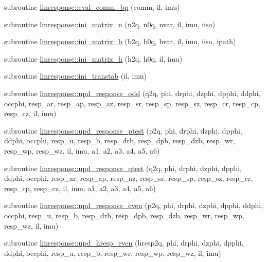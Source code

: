 \begin{DoxyCompactItemize}
\item 
subroutine \hyperlink{namespacelinresponse_adbdb635326275de10b74819756129ab1}{linresponse\+::eval\+\_\+comm\+\_\+bp} (comm, il, imu)
\item 
subroutine \hyperlink{namespacelinresponse_abc710f3e14e21d9ede646126558cac98}{linresponse\+::ini\+\_\+matrix\+\_\+n} (n2q, n0q, nvar, il, imu, iiso)
\item 
subroutine \hyperlink{namespacelinresponse_a294e9689fc6deb2f4dc10e196f9fccd9}{linresponse\+::ini\+\_\+matrix\+\_\+b} (b2q, b0q, bvar, il, imu, iiso, ipath)
\item 
subroutine \hyperlink{namespacelinresponse_a40b22e27e8ea2570813e27e87b83ffc3}{linresponse\+::ini\+\_\+matrix\+\_\+h} (h2q, h0q, il, imu)
\item 
subroutine \hyperlink{namespacelinresponse_a98499d053119f8816eb583fee6d3b324}{linresponse\+::ini\+\_\+transtab} (il, imu)
\item 
subroutine \hyperlink{namespacelinresponse_ae67606daa1380ebab58a59916942bc29}{linresponse\+::upd\+\_\+response\+\_\+odd} (q2q, phi, drphi, dzphi, dpphi, ddphi, occphi, resp\+\_\+ar, resp\+\_\+ap, resp\+\_\+az, resp\+\_\+sr, resp\+\_\+sp, resp\+\_\+sz, resp\+\_\+cr, resp\+\_\+cp, resp\+\_\+cz, il, imu)
\item 
subroutine \hyperlink{namespacelinresponse_a38e3c48d5c409e1d841d02727ff27488}{linresponse\+::upd\+\_\+response\+\_\+ptest} (p2q, phi, drphi, dzphi, dpphi, ddphi, occphi, resp\+\_\+u, resp\+\_\+b, resp\+\_\+drb, resp\+\_\+dpb, resp\+\_\+dzb, resp\+\_\+wr, resp\+\_\+wp, resp\+\_\+wz, il, imu, a1, a2, a3, a4, a5, a6)
\item 
subroutine \hyperlink{namespacelinresponse_ae0070fd7f0f72238fd255f7c9878daf1}{linresponse\+::upd\+\_\+response\+\_\+qtest} (q2q, phi, drphi, dzphi, dpphi, ddphi, occphi, resp\+\_\+ar, resp\+\_\+ap, resp\+\_\+az, resp\+\_\+sr, resp\+\_\+sp, resp\+\_\+sz, resp\+\_\+cr, resp\+\_\+cp, resp\+\_\+cz, il, imu, a1, a2, a3, a4, a5, a6)
\item 
subroutine \hyperlink{namespacelinresponse_a5f0a600485b5318b97a183ecbb632e14}{linresponse\+::upd\+\_\+response\+\_\+even} (p2q, phi, drphi, dzphi, dpphi, ddphi, occphi, resp\+\_\+u, resp\+\_\+b, resp\+\_\+drb, resp\+\_\+dpb, resp\+\_\+dzb, resp\+\_\+wr, resp\+\_\+wp, resp\+\_\+wz, il, imu)
\item 
subroutine \hyperlink{namespacelinresponse_aa613217289744fb8a260a787a6486cd5}{linresponse\+::upd\+\_\+hresp\+\_\+even} (hresp2q, phi, drphi, dzphi, dpphi, ddphi, occphi, resp\+\_\+u, resp\+\_\+b, resp\+\_\+wr, resp\+\_\+wp, resp\+\_\+wz, il, imu)

\end{DoxyCompactItemize}
